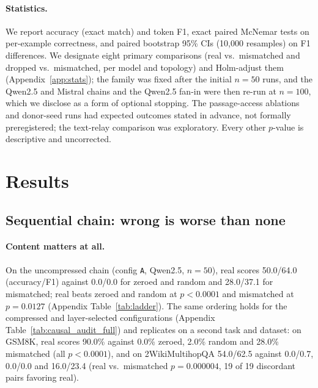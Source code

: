\documentclass[11pt]{article}
\begin{document}
\paragraph{Statistics.} We report accuracy (exact match) and token F1,
exact paired McNemar tests on per-example correctness, and paired
bootstrap 95\% CIs (10{,}000 resamples) on F1 differences. We designate
eight primary comparisons (real vs.\ mismatched and dropped vs.\
mismatched, per model and topology) and Holm-adjust them
(Appendix~\ref{app:stats}); the family was fixed after the initial
$n{=}50$ runs, and the Qwen2.5 and Mistral chains and the Qwen2.5 fan-in were
then re-run at $n{=}100$, which we disclose as a form of optional stopping. The
passage-access ablations and donor-seed runs had expected outcomes stated in
advance, not formally preregistered; the text-relay comparison was exploratory. Every
other $p$-value is descriptive and uncorrected.

\section{Results}
\label{sec:results}

\subsection{Sequential chain: wrong is worse than none}

\paragraph{Content matters at all.} On the uncompressed chain
(config \texttt{A}, Qwen2.5, $n{=}50$), real scores 50.0/64.0
(accuracy/F1) against 0.0/0.0 for zeroed and random and 28.0/37.1 for
mismatched; real beats zeroed and random at $p<0.0001$ and mismatched at
$p=0.0127$ (Appendix Table~\ref{tab:ladder}). The same ordering holds for the
compressed and layer-selected configurations (Appendix
Table~\ref{tab:causal_audit_full}) and replicates on a second task and
dataset: on GSM8K, real scores 90.0\% against 0.0\% zeroed, 2.0\% random and
28.0\% mismatched (all $p<0.0001$), and on 2WikiMultihopQA 54.0/62.5 against
0.0/0.7, 0.0/0.0 and 16.0/23.4 (real vs.\ mismatched $p=0.000004$, 19 of 19
discordant pairs favoring real).
\end{document}
